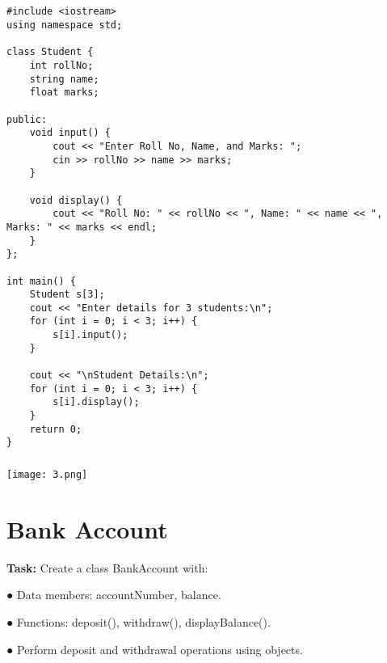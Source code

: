 \documentclass[12pt,a4paper]{article}
\begin{document}
\subsection{}
\begin{lstlisting}
#include <iostream>
using namespace std;

class Student {
    int rollNo;
    string name;
    float marks;

public:
    void input() {
        cout << "Enter Roll No, Name, and Marks: ";
        cin >> rollNo >> name >> marks;
    }

    void display() {
        cout << "Roll No: " << rollNo << ", Name: " << name << ", Marks: " << marks << endl;
    }
};

int main() {
    Student s[3];
    cout << "Enter details for 3 students:\n";
    for (int i = 0; i < 3; i++) {
        s[i].input();
    }

    cout << "\nStudent Details:\n";
    for (int i = 0; i < 3; i++) {
        s[i].display();
    }
    return 0;
}

\end{lstlisting}

\subsubsection{}
\begin{center}
    \texttt{[image: 3.png]}
\end{center}


\section{Bank Account}
\textbf{Task:} Create a class BankAccount with:
    \item ● Data members: accountNumber, balance.
    \item ● Functions: deposit(), withdraw(), displayBalance().
    \item ● Perform deposit and withdrawal operations using objects.
\end{document}

